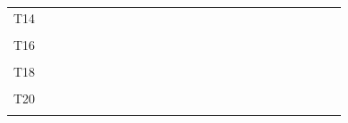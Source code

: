 \documentclass[
]{article}
\begin{document}
\begin{longtable}[l]{lllllllllllllllllllllllll}
T14 &  &  &  &  &  &  &  &  &  &  &  &  &  &  &  &  &  &  &  &  &  &  &  & \\
\cellcolor{gray!6}{T15} & \cellcolor{gray!6}{} & \cellcolor{gray!6}{} & \cellcolor{gray!6}{} & \cellcolor{gray!6}{} & \cellcolor{gray!6}{} & \cellcolor{gray!6}{} & \cellcolor{gray!6}{} & \cellcolor{gray!6}{} & \cellcolor{gray!6}{} & \cellcolor{gray!6}{} & \cellcolor{gray!6}{} & \cellcolor{gray!6}{} & \cellcolor{gray!6}{} & \cellcolor{gray!6}{} & \cellcolor{gray!6}{} & \cellcolor{gray!6}{} & \cellcolor{gray!6}{} & \cellcolor{gray!6}{} & \cellcolor{gray!6}{} & \cellcolor{gray!6}{} & \cellcolor{gray!6}{} & \cellcolor{gray!6}{} & \cellcolor{gray!6}{} & \cellcolor{gray!6}{}\\
\addlinespace
T16 &  &  &  &  &  &  &  &  &  &  &  &  &  &  &  &  &  &  &  &  &  &  &  & \\
\cellcolor{gray!6}{T17} & \cellcolor{gray!6}{} & \cellcolor{gray!6}{} & \cellcolor{gray!6}{} & \cellcolor{gray!6}{} & \cellcolor{gray!6}{} & \cellcolor{gray!6}{} & \cellcolor{gray!6}{} & \cellcolor{gray!6}{} & \cellcolor{gray!6}{} & \cellcolor{gray!6}{} & \cellcolor{gray!6}{} & \cellcolor{gray!6}{} & \cellcolor{gray!6}{} & \cellcolor{gray!6}{} & \cellcolor{gray!6}{} & \cellcolor{gray!6}{} & \cellcolor{gray!6}{} & \cellcolor{gray!6}{} & \cellcolor{gray!6}{} & \cellcolor{gray!6}{} & \cellcolor{gray!6}{} & \cellcolor{gray!6}{} & \cellcolor{gray!6}{} & \cellcolor{gray!6}{}\\
T18 &  &  &  &  &  &  &  &  &  &  &  &  &  &  &  &  &  &  &  &  &  &  &  & \\
\cellcolor{gray!6}{T19} & \cellcolor{gray!6}{} & \cellcolor{gray!6}{} & \cellcolor{gray!6}{} & \cellcolor{gray!6}{} & \cellcolor{gray!6}{} & \cellcolor{gray!6}{} & \cellcolor{gray!6}{} & \cellcolor{gray!6}{} & \cellcolor{gray!6}{} & \cellcolor{gray!6}{} & \cellcolor{gray!6}{} & \cellcolor{gray!6}{} & \cellcolor{gray!6}{} & \cellcolor{gray!6}{} & \cellcolor{gray!6}{} & \cellcolor{gray!6}{} & \cellcolor{gray!6}{} & \cellcolor{gray!6}{} & \cellcolor{gray!6}{} & \cellcolor{gray!6}{} & \cellcolor{gray!6}{} & \cellcolor{gray!6}{} & \cellcolor{gray!6}{} & \cellcolor{gray!6}{}\\
T20 &  &  &  &  &  &  &  &  &  &  &  &  &  &  &  &  &  &  &  &  &  &  &  & \\
\addlinespace
\cellcolor{gray!6}{T21} & \cellcolor{gray!6}{} & \cellcolor{gray!6}{} & \cellcolor{gray!6}{} & \cellcolor{gray!6}{} & \cellcolor{gray!6}{} & \cellcolor{gray!6}{} & \cellcolor{gray!6}{} & \cellcolor{gray!6}{} & \cellcolor{gray!6}{} & \cellcolor{gray!6}{} & \cellcolor{gray!6}{} & \cellcolor{gray!6}{} & \cellcolor{gray!6}{} & \cellcolor{gray!6}{} & \cellcolor{gray!6}{} & \cellcolor{gray!6}{} & \cellcolor{gray!6}{} & \cellcolor{gray!6}{} & \cellcolor{gray!6}{} & \cellcolor{gray!6}{} & \cellcolor{gray!6}{} & \cellcolor{gray!6}{} & \cellcolor{gray!6}{} & \cellcolor{gray!6}{}\\

\end{longtable}
\end{document}
